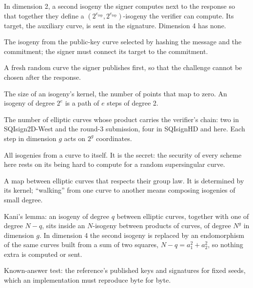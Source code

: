 \documentclass[version=preprint]{iacrcc}
\begin{document}
    \begin{description}[style=nextline,leftmargin=2em,font=\normalfont\itshape]
        \item[auxiliary isogeny]
        In dimension 2, a second isogeny the signer computes next to the response
        so that together they define a $(2^{e_{\mathrm{rsp}}}, 2^{e_{\mathrm{rsp}}})$-isogeny the verifier can compute.
        Its target, the auxiliary curve, is sent in the signature. Dimension 4 has
        none.
        \item[challenge]
        The isogeny from the public-key curve selected by hashing the message and the commitment; the signer must connect its target to the
        commitment.
        \item[commitment]
        A fresh random curve the signer publishes first, so that the challenge
        cannot be chosen after the response.
        \item[degree]
        The size of an isogeny's kernel, the number of points that map to zero.
        An isogeny of degree $2^e$ is a path of $e$ steps of degree 2.
        \item[dimension (of the embedding)]
        The number of elliptic curves whose product carries the verifier's chain:
        two in SQIsign2D-West and the round-3 submission, four in SQIsignHD and here.
        Each step in dimension $g$ acts on $2^g$ coordinates.
        \item[endomorphism ring]
        All isogenies from a curve to itself. It is the secret: the security of
        every scheme here rests on its being hard to compute for a random
        supersingular curve.
        \item[isogeny]
        A map between elliptic curves that respects their group law. It is
        determined by its kernel; ``walking'' from one curve to another means
        composing isogenies of small degree.
        \item[Kani embedding]
        Kani's lemma: an isogeny of degree $q$ between elliptic curves,
        together with one of degree $N - q$, sits inside an $N$-isogeny between
        products of curves, of degree $N^g$ in dimension $g$. In dimension 4
        the second isogeny is replaced by an endomorphism of the same curves
        built from a sum of two squares, $N - q = a_1^2 + a_2^2$, so nothing
        extra is computed or sent.
    \item[KAT]
        Known-answer test: the reference's published keys and signatures for fixed
        seeds, which an implementation must reproduce byte for byte.

\end{description}
\end{document}
